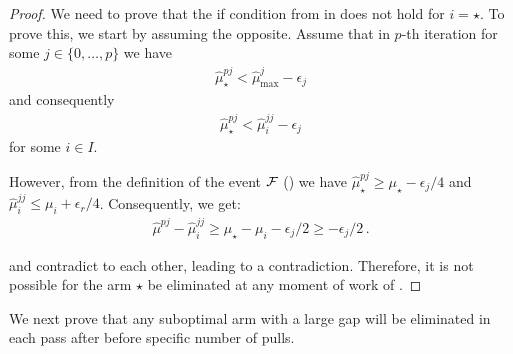 \begin{proof}
	We need to prove that the if condition from  in  does not hold for \(i = \star\). To prove this, we start by assuming the opposite. Assume that in \(p\)-th iteration for some \(j \in \{0, \dotsc, p\}\) we have 
	\begin{align*}
		\hat\mu^{pj}_{\star} < \hat\mu^j_{\max} - \epsilon_j
	\end{align*}
	and consequently
	\begin{align}\label{eq:improved-upper}
		\hat\mu^{pj}_{\star} < \hat\mu^{jj}_i - \epsilon_j
	\end{align}
	for some \(i \in I\). 
	
	However, from the definition of the event \(\mathcal{F}\) () we have \(\hat\mu^{pj}_\star \geq \mu_\star - \epsilon_j / 4\) and \(\hat\mu^{jj}_i \leq \mu_i + \epsilon_r / 4\). Consequently, we get: 
	\begin{align}\label{eq:improved-lower}
		\hat\mu^{pj} - \hat\mu^{jj}_i \ge \mu_\star - \mu_i - \epsilon_j / 2 \ge -\epsilon_j / 2 \,.
	\end{align}
	
	 and  contradict to each other, leading to a contradiction. Therefore, it is not possible for the arm \(\star\) be eliminated at any moment of work of . 
\end{proof}

We next prove that any suboptimal arm with a large gap will be eliminated in each pass after before specific number of pulls. 

